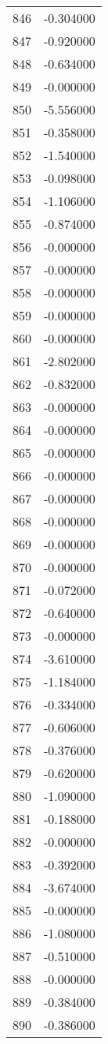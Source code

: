 \documentclass[12pt]{article}
\begin{document}
\begin{longtable}{@{}cc@{}}
846 & -0.304000 \\
847 & -0.920000 \\
848 & -0.634000 \\
849 & -0.000000 \\
850 & -5.556000 \\
851 & -0.358000 \\
852 & -1.540000 \\
853 & -0.098000 \\
854 & -1.106000 \\
855 & -0.874000 \\
856 & -0.000000 \\
857 & -0.000000 \\
858 & -0.000000 \\
859 & -0.000000 \\
860 & -0.000000 \\
861 & -2.802000 \\
862 & -0.832000 \\
863 & -0.000000 \\
864 & -0.000000 \\
865 & -0.000000 \\
866 & -0.000000 \\
867 & -0.000000 \\
868 & -0.000000 \\
869 & -0.000000 \\
870 & -0.000000 \\
871 & -0.072000 \\
872 & -0.640000 \\
873 & -0.000000 \\
874 & -3.610000 \\
875 & -1.184000 \\
876 & -0.334000 \\
877 & -0.606000 \\
878 & -0.376000 \\
879 & -0.620000 \\
880 & -1.090000 \\
881 & -0.188000 \\
882 & -0.000000 \\
883 & -0.392000 \\
884 & -3.674000 \\
885 & -0.000000 \\
886 & -1.080000 \\
887 & -0.510000 \\
888 & -0.000000 \\
889 & -0.384000 \\
890 & -0.386000 \\

\end{longtable}
\end{document}
